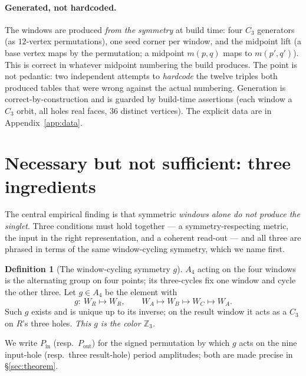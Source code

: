 \documentclass[11pt]{article}
\theoremstyle{definition}
\newtheorem{definition}{Definition}
\newcommand{\Z}{\mathbb{Z}}
\newcommand{\Pin}{P_{\mathrm{in}}}
\newcommand{\Pout}{P_{\mathrm{out}}}
\newcommand{\winA}{W_{\!A}}
\newcommand{\winB}{W_{\!B}}
\newcommand{\winC}{W_{\!C}}
\newcommand{\winR}{W_{\!R}}
\begin{document}
\paragraph{Generated, not hardcoded.} The windows are produced \emph{from the
symmetry} at build time: four $C_3$ generators (as $12$-vertex permutations), one
seed corner per window, and the midpoint lift (a base vertex maps by the permutation;
a midpoint $m(p,q)$ maps to $m(p',q')$). This is correct in whatever midpoint
numbering the build produces. The point is not pedantic: two independent attempts to
\emph{hardcode} the twelve triples both produced tables that were wrong against the
actual numbering. Generation is correct-by-construction and is guarded by build-time
assertions (each window a $C_3$ orbit, all holes real faces, $36$ distinct vertices).
The explicit data are in Appendix~\ref{app:data}.

\section{Necessary but not sufficient: three ingredients}
\label{sec:ingredients}

The central empirical finding is that symmetric \emph{windows alone do not produce the
singlet}. Three conditions must hold together --- a symmetry-respecting metric, the
input in the right representation, and a coherent read-out --- and all three are
phrased in terms of the same window-cycling symmetry, which we name first.

\begin{definition}[The window-cycling symmetry $g$]
\label{def:g}
$A_4$ acting on the four windows is the alternating group on four points; its
three-cycles fix one window and cycle the other three. Let $g\in A_4$ be the element
with
\begin{equation}
  g:\ \winR \mapsto \winR,\qquad \winA\mapsto\winB\mapsto\winC\mapsto\winA .
  \label{eq:g}
\end{equation}
Such $g$ exists and is unique up to its inverse; on the result window it acts as a
$C_3$ on $R$'s three holes. \emph{This $g$ is the color $\Z_3$.}
\end{definition}

We write $\Pin$ (resp.\ $\Pout$) for the signed permutation by which $g$ acts on the
nine input-hole (resp.\ three result-hole) period amplitudes; both are made precise in
\S\ref{sec:theorem}.
\end{document}
